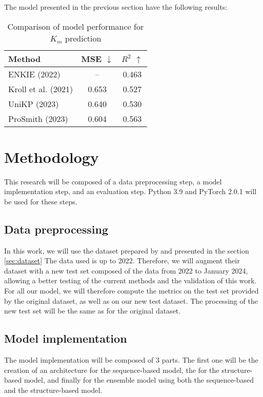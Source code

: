 The model presented in the previous section have the following results:

\begin{table}[ht]
  \centering
  \begin{tabular}{lcc}
    \hline
    Method & MSE \(\downarrow\) & \(R^2\) \(\uparrow\) \\
    \hline
    ENKIE (2022) & -- & 0.463 \\
    Kroll et al. (2021) & 0.653 & 0.527 \\
    UniKP (2023) & 0.640 & 0.530 \\
    ProSmith (2023) & 0.604 & 0.563 \\
    \hline
  \end{tabular}
  \caption{Comparison of model performance for $K_m$ prediction}
  \label{tab:model_performance}
\end{table}


\section{Methodology}
This research will be composed of a data preprocessing step, a model implementation step, and an
evaluation step. Python 3.9 and PyTorch 2.0.1 will be used for these steps.

\subsection{Data preprocessing}
In this work, we will use the dataset prepared by \citeauthor{km1} and presented in the section \ref{sec:dataset}
The data used is up to 2022. Therefore, we will augment their dataset with a new test set composed of
the data from 2022 to January 2024, allowing a better testing of the current methods and the validation
of this work.
For all our model, we will therefore compute the metrics on the test set provided by the original dataset,
as well as on our new test dataset.
The processing of the new test set will be the same as for the original dataset.

\subsection{Model implementation}
The model implementation will be composed of 3 parts. The first one will be the creation of an architecture
for the sequence-based model, the for the structure-based model, and finally for the ensemble model using both
the sequence-based and the structure-based model.

